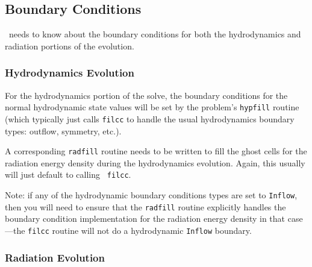 \subsection{Boundary Conditions}

\castro\ needs to know about the boundary conditions for both
the hydrodynamics and radiation portions of the evolution.

\subsubsection{Hydrodynamics Evolution}

For the hydrodynamics portion of the solve, the boundary conditions
for the normal hydrodynamic state values will be set by the problem's
{\tt hypfill} routine (which typically just calls {\tt filcc} to handle
the usual hydrodynamics boundary types: outflow, symmetry, etc.).

A corresponding {\tt radfill} routine needs to be written to fill the
ghost cells for the radiation energy density during the hydrodynamics
evolution.  Again, this usually will just default to calling {\tt
  filcc}.

Note: if any of the hydrodynamic boundary conditions types are set
to {\tt Inflow}, then you will need to ensure that the {\tt radfill}
routine explicitly handles the boundary condition implementation
for the radiation energy density in that case---the {\tt filcc}
routine will not do a hydrodynamic {\tt Inflow} boundary.


\subsubsection{Radiation Evolution}

